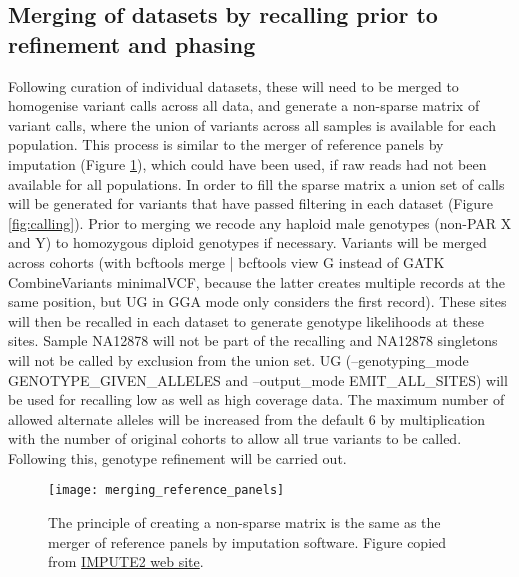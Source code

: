 \subsection{Merging of datasets by recalling prior to refinement and phasing}
Following curation of individual datasets, these will need to be merged to homogenise variant calls across all data, and generate a non-sparse matrix of variant calls, where the union of variants across all samples is available for each population. This process is similar to the merger of reference panels by imputation (Figure \ref{fig:merging_reference_panels}), which could have been used, if raw reads had not been available for all populations. In order to fill the sparse matrix a union set of calls will be generated for variants that have passed filtering in each dataset (Figure \ref{fig:calling}). Prior to merging we recode any haploid male genotypes (non-PAR X and Y) to homozygous diploid genotypes if necessary. %
Variants will be merged across cohorts (with bcftools merge | bcftools view \-G instead of GATK CombineVariants \-\-minimalVCF, because the latter creates multiple records at the same position, but UG in GGA mode only considers the first record).
These sites will then be recalled in each dataset to generate genotype likelihoods at these sites. Sample NA12878 will not be part of the recalling and NA12878 singletons will not be called by exclusion from the union set.
UG (--genotyping\_mode GENOTYPE\_GIVEN\_ALLELES and --output\_mode EMIT\_ALL\_SITES) will be used for recalling low as well as high coverage data.
The maximum number of allowed alternate alleles will be increased from the default 6 by multiplication with the number of original cohorts to allow all true variants to be called. %
Following this, genotype refinement will be carried out.

\begin{figure}[!htbp]
\centering
\texttt{[image: merging\_reference\_panels]}
\caption{The principle of creating a non-sparse matrix is the same as the merger of reference panels by imputation software. Figure copied from \href{http://mathgen.stats.ox.ac.uk/impute/merging\_reference\_panels.png}{IMPUTE2 web site}.}
\label{fig:merging_reference_panels}
\end{figure}